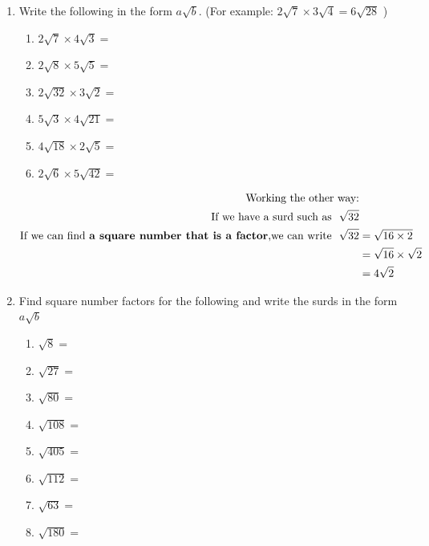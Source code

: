 \documentclass[a4paper,12pt]{article}
\begin{document}
\begin{enumerate}
	\item Write the following in the form $a\sqrt{b}$.
	(\footnotesize For example: $2\sqrt{7}\times 3\sqrt{4}=6\sqrt{28}$ \normalsize)
	\begin{multicols}{2}
		\begin{enumerate}
			\item $\displaystyle 2\sqrt{7}\times 4\sqrt{3}=$
			\item $\displaystyle 2\sqrt{8}\times 5\sqrt{5}=$
			\item $\displaystyle 2\sqrt{32}\times 3\sqrt{2}=$
			\item $\displaystyle 5\sqrt{3}\times 4\sqrt{21}=$
			\item $\displaystyle 4\sqrt{18}\times 2\sqrt{5}=$
			\item $\displaystyle 2\sqrt{6}\times 5\sqrt{42}=$
		\end{enumerate}
	\end{multicols}
	\begin{align*}
	\text{Working the other way:}&\\
	\text{If we have a surd such as~~} \sqrt{32}&\\
	\text{If we can find \textbf{a square number that is a factor},we can write~~} \sqrt{32}&=\sqrt{16\times 2}\\
	&=\sqrt{16}\times \sqrt{2}\\
	&=4\sqrt{2} 
	\end{align*}
	\item Find square number factors for the following and write the surds in the form $a\sqrt{b}$
	\begin{multicols}{2}
		\begin{enumerate}
			\item $\displaystyle \sqrt{8}=$
			\item $\displaystyle \sqrt{27}=$
			\item $\displaystyle \sqrt{80}=$
			\item $\displaystyle \sqrt{108}=$
			\item $\displaystyle \sqrt{405}=$
			\item $\displaystyle \sqrt{112}=$
			\item $\displaystyle \sqrt{63}=$
			\item $\displaystyle \sqrt{180}=$
		\end{enumerate}
	\end{multicols}
\end{enumerate}
\newpage
\end{document}
